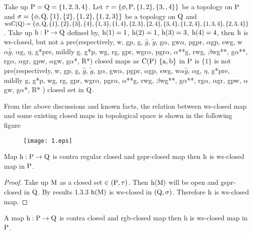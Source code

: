 \begin{exm}\label{exam4.2.13}
Take up $\mathrm{P}=\mathrm{Q}= \{1, 2, 3, 4\}$. Let $\tau= \{\phi, \mathrm{P}, \{1,2\}, \{3,,4 \}\}$ be a topology on $\mathrm{P}$ and $\sigma=\{\phi, \mathrm{Q}, \{1\}, \{2\}, \{1,2\},\{1,2,3\}\}$ be a topology on $\mathrm{Q}$ and $\ws\TSC(\TSQ)=\{\phi, \TSQ, \{1\},\{2\},\{3\},\{4\},\{1,3\}, \{1,4\},\{2,3\},\{2,4\},\{3,4\},\{1,2,4\},\break \{1,3,4\}, \{2,3,4\}\}$. Take up $\mathrm{h}: \mathrm{P} \to \mathrm{Q}$ defined by, $\mathrm{h}(1) = 1$, $\mathrm{h}(2) = 1$, $\mathrm{h}(3) = 3$, $\mathrm{h}(4)=4$, then $\mathrm{h}$ is ws-closed, but not a pre(respectively, w, gp, g, $\hat{g}$, $\tilde{g}$, g$\alpha$, gw$\alpha$, pgpr, $\alpha$gp, swg, w$\alpha\hat{g}$, $\alpha$g, $\eta$, g*pre, mildly g, g*p, wg, rg, gpr, wgr$\alpha$, pgr$\alpha$, $\alpha$**g, rwg, $\beta$wg**, g$\alpha$**, rg$\alpha$, $\alpha$gr, gpw, $\alpha$gw, g$\alpha$*, R*) closed maps as $\mathrm{C}(\mathrm{P})$ $\{\mathrm{a} , \mathrm{b}\}$ in $\mathrm{P}$ is $\{1\}$ is not pre(respectively, w, gp, g, $\hat{g}$, $\tilde{g}$, g$\alpha$, gw$\alpha$, pgpr, $\alpha$gp, swg, w$\alpha\hat{g}$, $\alpha$g, $\eta$, g*pre, mildly g, g*p, wg, rg, gpr, wgr$\alpha$, pgr$\alpha$, $\alpha$**g, rwg, $\beta$wg**, g$\alpha$**, rg$\alpha$, $\alpha$gr, gpw, $\alpha$gw, g$\alpha$*, R* ) closed set in $\mathrm{Q}$.
\end{exm}

\begin{rem}\label{rem4.2.14}
From the above discussions and known facts, the relation between ws-closed map and some existing closed maps in topological space is shown in the following figure
\begin{figure}[!ht]
\centering
\texttt{[image: 1.eps]}
\end{figure}
\end{rem}

\begin{thm}\label{thm4.2.15}
Map $\mathrm{h}: \mathrm{P} \to \mathrm{Q}$ is contra regular closed and gspr-closed map then $\mathrm{h}$ is ws-closed map in $\mathrm{P}$.
\end{thm}

\begin{proof}
Take up $\mathrm{M}$ as a closed set $\in (\mathrm{P}, \tau)$. Then $\mathrm{h} (\mathrm{M})$ will be open and gspr-closed in $\mathrm{Q}$. By results 1.3.3 $\mathrm{h} (\mathrm{M})$ is ws-closed in $(\mathrm{Q}, \sigma)$. Therefore $\mathrm{h}$ is ws-closed map.
\end{proof}

\begin{thm}\label{thm4.2.16}
A map $\mathrm{h}: \mathrm{P} \to \mathrm{Q}$ is contra closed and rgb-closed map then h is ws-closed map in $\mathrm{P}$.
\end{thm}

